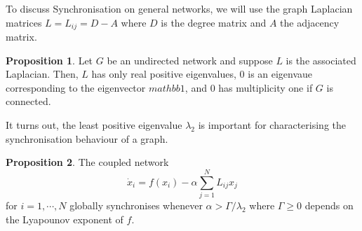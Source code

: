 \documentclass[
]{article}
\theoremstyle{definition}
\newtheorem{prop}{Proposition}[theorem]
\theoremstyle{definition}
\begin{document}
To discuss Synchronisation on general networks, we will use the graph
Laplacian matrices \(L = L_{ij} = D - A\) where \(D\) is the degree
matrix and \(A\) the adjacency matrix.

\begin{prop}
  Let \(G\) be an undirected network and suppose \(L\) is the associated Laplacian.
  Then, \(L\) has only real positive eigenvalues, \(0\) is an eigenvaue corresponding 
  to the eigenvector \(mathbb{1}\), and \(0\) has multiplicity one if \(G\) is 
  connected.
\end{prop}

It turns out, the least positive eigenvalue \(\lambda_2\) is important
for characterising the synchronisation behaviour of a graph.

\begin{prop}
  The coupled network 
  \[\dot x_i = f(x_i) - \alpha \sum_{j = 1}^N L_{ij}x_j\]
  for \(i = 1, \cdots, N\) globally synchronises whenever 
  \(\alpha > \Gamma / \lambda_2\) where \(\Gamma \ge 0\) depends on the 
  Lyapounov exponent of \(f\). 
\end{prop}
\end{document}
